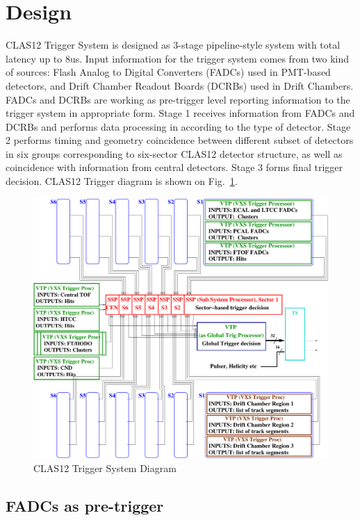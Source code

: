 \section{Design}

CLAS12 Trigger System is designed as 3-stage pipeline-style system with total latency up to 8us. Input information for the trigger system comes from two kind of sources:  Flash Analog to Digital Converters (FADCs) used in PMT-based detectors, and Drift Chamber Readout Boards (DCRBs) used in Drift Chambers. FADCs and DCRBs are working as pre-trigger level reporting information to the trigger system in appropriate form. Stage 1 receives information from FADCs and DCRBs and performs data processing in according to the type of detector. Stage 2 performs timing and geometry coincidence between different subset of detectors in six groups corresponding to six-sector CLAS12 detector structure, as well as coincidence with information from central detectors. Stage 3 forms final trigger decision. CLAS12 Trigger diagram is shown on Fig.~\ref{fig:TriggerDiagram}.

\begin{figure}[hbt]
	\centering
	\includegraphics[width=1.0\columnwidth,keepaspectratio]{img/CLAS12_TRIGGER_1.pdf}
	\caption{CLAS12 Trigger System Diagram}
	\label{fig:TriggerDiagram}
\end{figure}


\subsection{FADCs as pre-trigger}

